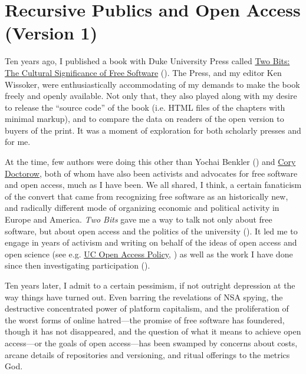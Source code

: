 \documentclass[11pt]{article}
\author{Christopher Kelty}
\date{\today}
\title{}
\begin{document}
\section*{Recursive Publics and Open Access (Version 1)}
\label{sec:org04d15e1}

\maketitle
\onehalfspacing 

Ten years ago, I published a book with Duke University Press called \href{https://twobits.net/download/index.html}{Two Bits: The Cultural Significance of Free Software} (\cite{kelty2008twobits}). The Press, and my editor Ken Wissoker, were enthusiastically accommodating of my demands to make the book freely and openly available.  Not only that, they also played along with my desire to release the ``source code'' of the book (i.e. HTML files of the chapters with minimal markup), and to compare the data on readers of the open version to buyers of the print.  It was a moment of exploration for both scholarly presses and for me. 

At the time, few authors were doing this other than Yochai Benkler (\cite{benkler2007wealnetw}) and \href{https://craphound.com/}{Cory Doctorow}, both of whom have also been activists and advocates for free software and open access, much as I have been.  We all shared, I think, a certain fanaticism of the convert that came from recognizing free software as an historically new, and radically different mode of organizing economic and political activity in Europe and America. \emph{Two Bits} gave me a way to talk not only about free software, but about open access and the politics of the university (\cite{kelty2008anthincirc,kelty2014beyoncopytech}).  It led me to engage in years of activism and writing on behalf of the ideas of open access and open science (see e.g. \href{https://osc.universityofcalifornia.edu/open-access-policy/policy-history/}{UC Open Access Policy}, \cite{kelty_outlaw_2010}) as well as the work I have done since then investigating participation (\cite{fish2011birdinter,kelty2018twomodespart}). 

Ten years later, I admit to a certain pessimism, if not outright depression at the way things have turned out.  Even barring the revelations of NSA spying, the destructive concentrated power of platform capitalism, and the proliferation of the worst forms of online hatred---the promise of free software has foundered, though it has not disappeared, and the question of what it means to achieve open access---or the goals of open access---has been swamped by concerns about costs, arcane details of repositories and versioning, and ritual offerings to the metrics God.  
\end{document}
